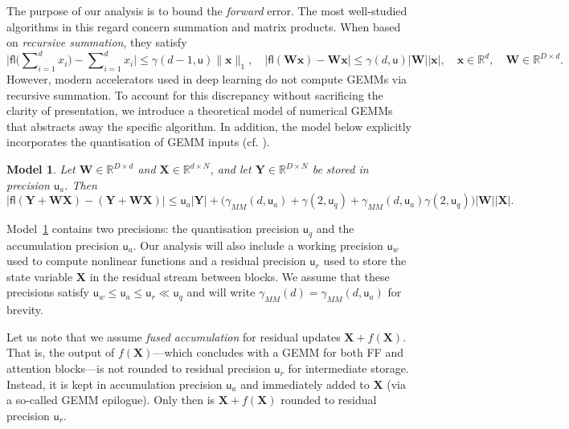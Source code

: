 \documentclass[namedate,webpdf,imanum]{ima-authoring-template}
\newcommand{\Real}{\mathbb{R}}
\newcommand{\Matrix}[1]{\mathbf{#1}}
\newcommand{\Norm}[3][]{#1\| #2 #1\|_{\mathrm{#3}}}
\newcommand{\fl}[2][]{\mathsf{fl}#1( #2 #1)}
\newcommand{\uh}{\mathsf{u}}
\newtheorem{model}[theorem]{Model}
\numberwithin{equation}{section}
\begin{document}
The purpose of our analysis is to bound the \emph{forward} error.
The most well-studied algorithms in this regard concern summation and matrix products.
When based on \emph{recursive summation}, they satisfy
\begin{equation*}
    \Big|\fl[\Big]{\sum\nolimits_{i = 1}^d x_i} - \sum\nolimits_{i = 1}^d x_i\Big| \leq \gamma(d-1,\uh) \Norm{\Matrix{x}}{1}, \quad |\fl{\Matrix{W x}} - \Matrix{W x}| \leq \gamma(d,\uh) \Matrix{|W| |x|}, \quad \Matrix{x} \in \Real^{d}, \quad \Matrix{W} \in \Real^{D \times d}.
\end{equation*}
However, modern accelerators used in deep learning do not compute GEMMs via recursive summation.
To account for this discrepancy without sacrificing the clarity of presentation, we introduce a theoretical model of numerical GEMMs that abstracts away the specific algorithm.
In addition, the model below explicitly incorporates the quantisation of GEMM inputs (cf. \cite{blanchard2020mixed}).

\begin{model}
\label{model:fp_gemm}
Let $\Matrix{W} \in \Real^{D \times d}$ and $\Matrix{X} \in \Real^{d \times N}$, and let $\Matrix{Y} \in \Real^{D \times N}$ be stored in precision $\uh_{a}$. Then
\begin{equation*}
    |\fl{\Matrix{Y} + \Matrix{W X}} - (\Matrix{Y} + \Matrix{W X})| \leq \uh_{a} |\Matrix{Y}| + \Big( \gamma_{MM}(d, \uh_{a}) + \gamma(2, \uh_{q}) + \gamma_{MM}(d, \uh_{a})\gamma(2, \uh_{q}) \Big) \Matrix{|W| |X|}.
\end{equation*}
\end{model}

Model~\ref{model:fp_gemm} contains two precisions: the quantisation precision $\uh_{q}$ and the accumulation precision $\uh_{a}$.
Our analysis will also include a working precision $\uh_{w}$ used to compute nonlinear functions and a residual precision $\uh_{r}$ used to store the state variable $\Matrix{X}$ in the residual stream between blocks.
We assume that these precisions satisfy $\uh_{w} \leq \uh_{a} \leq \uh_{r} \ll \uh_{q}$ and will write $\gamma_{MM}(d) = \gamma_{MM}(d, \uh_a)$ for brevity.

Let us note that we assume \emph{fused accumulation} for residual updates $\Matrix{X} + f(\Matrix{X})$.
That is, the output of $f(\Matrix{X})$---which concludes with a GEMM for both FF and attention blocks---is not rounded to residual precision $\uh_{r}$ for intermediate storage.
Instead, it is kept in accumulation precision $\uh_{a}$ and immediately added to $\Matrix{X}$ (via a so-called GEMM epilogue).
Only then is $\Matrix{X} + f(\Matrix{X})$ rounded to residual precision $\uh_{r}$.
\end{document}
